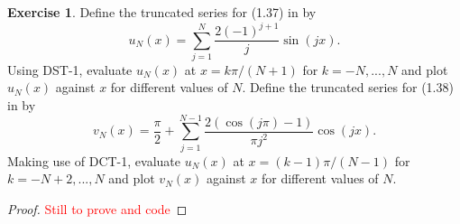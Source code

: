 \documentclass{amsart}
\theoremstyle{plain}
\theoremstyle{definition}
\newtheorem{exer}{Exercise}[section]
\newcommand{\tcr}[1]{\textcolor{red}{#1}}
\begin{document}
\begin{exer}
    Define the truncated series for (1.37) in \cite{lord2014introduction} by
$$u_N (x) = \sum_{j=1}^N \frac{2\left(-1\right)^{j+1}}{j}\sin(jx).$$
Using DST-1, evaluate $u_N(x)$ at $x = k\pi/(N +1)$ for $k =−N,...,N$ and plot $u_N(x)$
against $x$ for different values of $N$. Define the truncated series for (1.38) in \cite{lord2014introduction} by
$$v_N (x) = \frac{\pi}{2}+ \sum_{j=1}^{N-1} \frac{2\left(\cos(j\pi)-1\right)}{\pi j^2}\cos(jx).$$
Making use of DCT-1, evaluate $u_N(x)$ at $x =(k -1)\pi/(N-1)$ for $k =-N +2,...,N$
and plot $v_N (x)$ against $x$ for different values of $N$.

\end{exer}
\begin{proof}
    \tcr{Still to prove and code}
\end{proof}

\printbibliography
\end{document}
